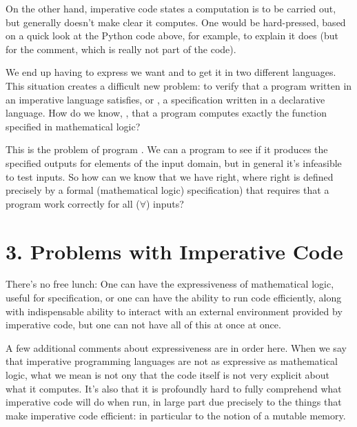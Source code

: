 \documentclass[letterpaper,10pt,english]{sphinxmanual}
\begin{document}
On the other hand, imperative code states  a computation is to be
carried out, but generally doesn’t make clear  it computes. One
would be hard-pressed, based on a quick look at the Python code above,
for example, to explain  it does (but for the comment, which is
really not part of the code).

We end up having to express  we want and  to get it in two
different languages. This situation creates a difficult new problem:
to verify that a program written in an imperative language satisfies,
or , a specification written in a declarative language.  How
do we know, , that a program computes exactly the function
specified in mathematical logic?

This is the problem of program . We can  a program
to see if it produces the specified outputs for  elements of the
input domain, but in general it’s infeasible to test  inputs. So
how can we know that we have  right, where right is
defined precisely by a formal (mathematical logic) specification) that
requires that a program work correctly for all (\(\forall\)) inputs?


\chapter{3. Problems with Imperative Code}
\label{\detokenize{03-problems-with-imperative-code:problems-with-imperative-code}}\label{\detokenize{03-problems-with-imperative-code::doc}}
There’s no free lunch: One can have the expressiveness of mathematical
logic, useful for specification, or one can have the ability to run
code efficiently, along with indispensable ability to interact with an
external environment provided by imperative code, but one can not have
all of this at once at once.

A few additional comments about expressiveness are in order here. When
we say that imperative programming languages are not as expressive as
mathematical logic, what we mean is not ony that the code itself is not
very explicit about what it computes. It’s also that it is profoundly
hard to fully comprehend what imperative code will do when run, in large
part due precisely to the things that make imperative code efficient: in
particular to the notion of a mutable memory.
\end{document}
